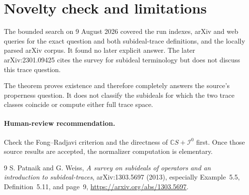 \documentclass[11pt]{article}
\newcommand{\cI}{\mathcal I}
\begin{document}
\section{Novelty check and limitations}

The bounded search on 9 August 2026 covered the run indexes, arXiv and web
queries for the exact question and both subideal-trace definitions, and the
locally parsed arXiv corpus.  It found no later explicit answer.  The later
arXiv:2301.09425 cites the survey for subideal terminology but does not discuss
this trace question.

The theorem proves existence and therefore completely answers the source's
properness question.  It does not classify the subideals for which the two
trace classes coincide or compute either full trace space.

\paragraph{Human-review recommendation.}
Check the Fong--Radjavi criterion and the directness of
$\mathbb C S+\cI^0$ first.  Once those source results are accepted, the
normalizer computation is elementary.

\begin{thebibliography}{9}
S. Patnaik and G. Weiss,
\emph{A survey on subideals of operators and an introduction to
subideal-traces}, arXiv:1303.5697 (2013), especially Example~5.5,
Definition~5.11, and page~9,
\url{https://arxiv.org/abs/1303.5697}.
\end{thebibliography}
\end{document}
